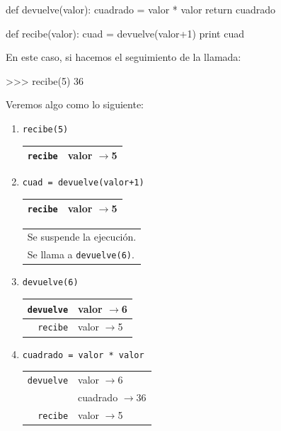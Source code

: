 \begin{codigo-python-sn}
def devuelve(valor):
    cuadrado = valor * valor
    return cuadrado

def recibe(valor):
    cuad = devuelve(valor+1)
    print cuad
\end{codigo-python-sn}

En este caso, si hacemos el seguimiento de la llamada:
\begin{codigo-python-sn}
>>> recibe(5)
36
\end{codigo-python-sn}

Veremos algo como lo siguiente:

\begin{enumerate}

\item  \verb|recibe(5)               | \hspace{1.5cm}
	\begin{tabular}{r|l|}
	\hline
	\verb|recibe|&valor $\rightarrow$5\\
	\hline
	\end{tabular}

\item  \verb|cuad = devuelve(valor+1)| \hspace{1.5cm}
	\begin{tabular}{r|l|}
	\hline
	\verb|recibe|&valor $\rightarrow$5\\
	\hline
	\end{tabular}
	\begin{tabular}{l}
	Se suspende la ejecución.\\
	Se llama a \verb|devuelve(6)|.
	\end{tabular}

\item  \verb|devuelve(6)             | \hspace{1.5cm}
	\begin{tabular}{r|l|}
	\hline
	\verb|devuelve|&valor $\rightarrow$6\\
	\hline
	\hline
	\verb|recibe|&valor $\rightarrow$5\\
	\hline
	\end{tabular}
	\hspace{1cm}

\item  \verb|cuadrado = valor * valor| \hspace{1.5cm}
	\begin{tabular}{r|l|}
	\hline
	\verb|devuelve|&valor $\rightarrow$6\\
	           &cuadrado $\rightarrow$36\\
	\hline
	\hline
	\verb|recibe|&valor $\rightarrow$5\\
	\hline
	\end{tabular}


\end{enumerate}
